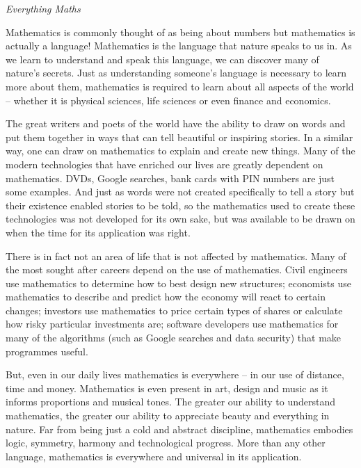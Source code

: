 \thispagestyle{empty}






\newpage
\thispagestyle{empty}

{\normalfont\sffamily\fontsize{22}\normalfont\itshape Everything Maths} \par

{
Mathematics is commonly thought of as being about numbers but mathematics is actually a language! Mathematics is the language that nature speaks to us in. As we learn to understand and speak this language, we can discover many of nature’s secrets. Just as understanding someone’s language is necessary to learn more about them, mathematics is required to learn about all aspects of the world -- whether it is physical sciences, life sciences or even finance and economics.\par


The great writers and poets of the world have the ability to draw on words and put them together in
ways that can tell beautiful or inspiring stories. In a similar way, one can draw on mathematics to
explain and create new things. Many of the modern technologies that have enriched our lives are
greatly dependent on mathematics. DVDs, Google searches, bank cards with PIN numbers are just
some examples. And just as words were not created specifically to tell a story but their existence enabled
stories to be told, so the mathematics used to create these technologies was not developed for its own sake,
but was available to be drawn on when the time for its application was right.\par


There is in fact not an area of life that is not affected by mathematics. Many of the most sought after
careers depend on the use of mathematics. Civil engineers use mathematics to determine how to best
design new structures; economists use mathematics to describe and predict how the economy will react
to certain changes; investors use mathematics to price certain types of shares or calculate how risky
particular investments are; software developers use mathematics for many of the algorithms (such as
Google searches and data security) that make programmes useful.\par



But, even in our daily lives mathematics is everywhere – in our use of distance, time and money.
Mathematics is even present in art, design and music as it informs proportions and musical tones. The
greater our ability to understand mathematics, the greater our ability to appreciate beauty and
everything in nature. Far from being just a cold and abstract discipline, mathematics
embodies logic, symmetry, harmony and technological progress. More than any other language,
mathematics is everywhere and universal in its application.\par


}
